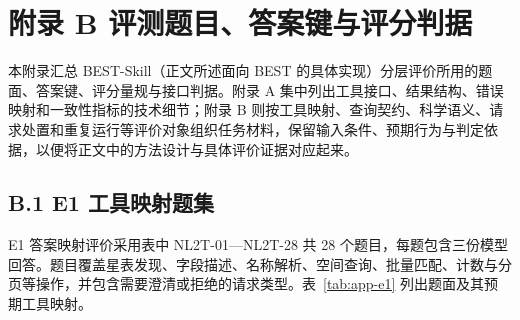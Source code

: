 \documentclass{dcfp}
\begin{document}
\section*{附录 B  评测题目、答案键与评分判据}

本附录汇总 BEST-Skill（正文所述面向 BEST 的具体实现）分层评价所用的题面、答案键、评分量规与接口判据。附录 A 集中列出工具接口、结果结构、错误映射和一致性指标的技术细节；附录 B 则按工具映射、查询契约、科学语义、请求处置和重复运行等评价对象组织任务材料，保留输入条件、预期行为与判定依据，以便将正文中的方法设计与具体评价证据对应起来。

\subsection*{B.1  E1 工具映射题集}

E1 答案映射评价采用表中 NL2T-01—NL2T-28 共 28 个题目，每题包含三份模型回答。题目覆盖星表发现、字段描述、名称解析、空间查询、批量匹配、计数与分页等操作，并包含需要澄清或拒绝的请求类型。表~\ref{tab:app-e1} 列出题面及其预期工具映射。
\end{document}

